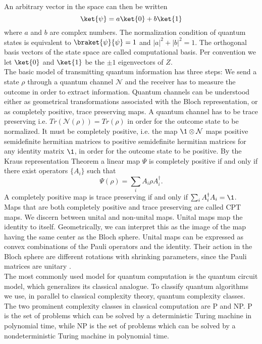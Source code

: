 An arbitrary vector in the space can then be written \[
\ket{\psi} = a\ket{0}+b\ket{1}
\]
where $a$ and $b$ are complex numbers.
The normalization condition of quantum states is equivalent to $\braket{\psi}{\psi}=1$ and $ \left| a \right|^2+\left| b \right|^2=1$.
The orthogonal basis vectors of the state space are called computational basis.
Per convention we let $\ket{0}$ and $\ket{1}$ be the $\pm 1$ eigenvectors of $Z$.\\
The basic model of transmitting quantum information has three steps:
We send a state $\rho$ through a quantum channel $\mathcal{N}$ and the receiver has to measure the outcome in order to extract information.
Quantum channels can be understood either as geometrical transformations associated with the Bloch representation, or as completely positive, trace preserving maps.
A quantum channel has to be trace preserving i.e. $Tr(\mathcal{N}(\rho))=Tr(\rho)$ in order for the outcome state to be normalized.
It must be completely positive, i.e. the map $\1\otimes\mathcal{N}$ maps positive semidefinite hermitian matrices to positive semidefinite hermitian matrices for any identity matrix $\1$, in order for the outcome state to be positive.
By the Kraus representation Theorem \cite{choi75} a linear map $\Psi$ is completely positive if and only if there exist operators $ \{A_i\} $ such that \[
\Psi\left(\rho\right)=\sum_{i}A_i\rho A_i^{\dagger}
.\]
A completely positive map is trace preserving if and only if $\sum_{i} A_i^{\dagger}A_i = \1$.\\
Maps that are both completely positive and trace preserving are called CPT maps.
We discern between unital and non-unital maps.
Unital maps map the identity to itself.
Geometrically, we can interpret this as the image of the map having the same center as the Bloch sphere.
Unital maps can be expressed as convex combinations of the Pauli operators and the identity.
Their action in the Bloch sphere are different rotations with shrinking parameters, since the Pauli matrices are unitary \cite{imre12}.\\
The most commonly used model for quantum computation is the quantum circuit model, which generalizes its classical analogue.
To classify quantum algorithms we use, in parallel to classical complexity theory, quantum complexity classes.
The two prominent complexity classes in classical computation are P and NP.
P is the set of problems which can be solved by a deterministic Turing machine in polynomial time, while NP is the set of problems which can be solved by a nondeterministic Turing machine in polynomial time.
